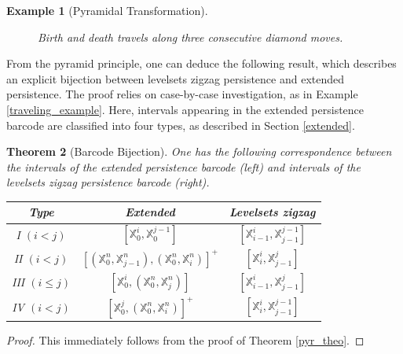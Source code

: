 \documentclass[11pt]{article}
\newtheorem{theorem}{Theorem}[section]
\newtheorem{example}[theorem]{Example}
\theoremstyle{remark}
\newcommand{\X}{\mathbb{X}}
\begin{document}
\begin{example}[Pyramidal Transformation]
\begin{figure}
\caption{Birth and death travels along three consecutive diamond moves.}
    \label{fig:travels}
\end{figure}
\end{example}




\noindent From the pyramid principle, one can deduce the following result, which describes an explicit bijection between levelsets zigzag persistence and extended persistence. The proof relies on case-by-case investigation, as in Example \ref{traveling_example}. Here, intervals appearing in the extended persistence barcode are classified into four types, as described in Section \ref{extended}. 

\begin{theorem}[Barcode Bijection]
\label{bijection_theorem}
One has the following correspondence between the intervals of the extended persistence barcode (left) and intervals of the levelsets zigzag persistence barcode (right).

\begin{center}
\begin{tabular}{|c c c|} 
 \hline
 Type & Extended & Levelsets zigzag\\ [0.5ex] 
 \hline
 I $(i<j)$ & $[\X_0^i,\X_0^{j-1}]$ & $[\X_{i-1}^i,\X_{j-1}^{j-1}]$ \\ 
\hline
 II $(i<j)$ & $[(\X_0^n,\X_{j-1}^n),(\X_0^n,\X_i^n)]^+$ & $[\X_i^i,\X_{j-1}^j]$ \\
 \hline
 III $(i\leq j)$ & $[\X_0^i,(\X_0^n,\X_j^n)]$ & $[\X_{i-1}^i,\X_{j-1}^j]$ \\
\hline
 IV $(i<j)$ & $[\X_0^j,(\X_0^n,\X_i^n)]^+$ & $[\X_{i}^i,\X_{j-1}^{j-1}]$ \\
 \hline
\end{tabular}
\end{center}

\end{theorem}
\begin{proof}
This immediately follows from the proof of Theorem \ref{pyr_theo}.
\end{proof}
\end{document}
